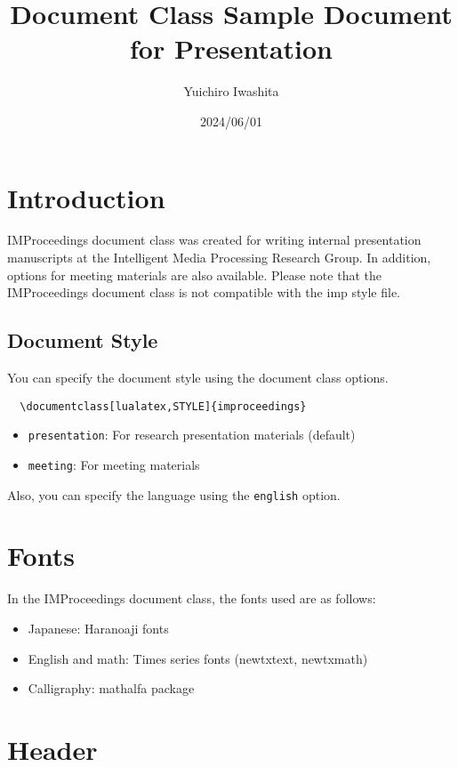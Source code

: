 \documentclass[lualatex,presentation,english]{improceedings}
\title{\pkg{IMProceedings} Document Class Sample Document for Presentation}
\date{2024/06/01}
\author{Yuichiro Iwashita}
\newcommand{\pkg}[1]{\textsf{#1}}
\newcommand{\code}[1]{\texttt{#1}}
\begin{document}
\maketitle

\section{Introduction}

\pkg{IMProceedings} document class was created for writing internal presentation manuscripts at the Intelligent Media Processing Research Group.
In addition, options for meeting materials are also available.
Please note that the \pkg{IMProceedings} document class is not compatible with the \pkg{imp} style file.

\subsection{Document Style}

You can specify the document style using the document class options.
\begin{verbatim}
  \documentclass[lualatex,STYLE]{improceedings}
\end{verbatim}
\begin{itemize}
  \item \code{presentation}: For research presentation materials (default)
  \item \code{meeting}: For meeting materials
\end{itemize}
Also, you can specify the language using the \code{english} option.

\section{Fonts}

In the \pkg{IMProceedings} document class, the fonts used are as follows:
\begin{itemize}
  \item Japanese: Haranoaji fonts
  \item English and math: Times series fonts (\pkg{newtxtext}, \pkg{newtxmath})
  \item Calligraphy: \pkg{mathalfa} package
\end{itemize}

\section{Header}
\end{document}
